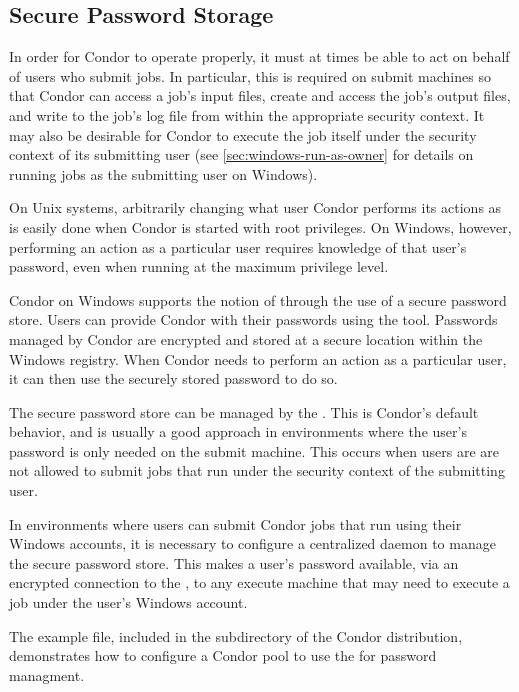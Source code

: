 \subsection{\label{sec:windows-sps}Secure Password Storage}

In order for Condor to operate properly, it must at times be able to
act on behalf of users who submit jobs.  In particular, this is
required on submit machines so that Condor can access a job's input
files, create and access the job's output files, and write to the
job's log file from within the appropriate security context.  It may
also be desirable for Condor to execute the job itself under the
security context of its submitting user (see
\ref{sec:windows-run-as-owner} for details on running jobs as the
submitting user on Windows).

On Unix systems, arbitrarily changing what user Condor performs its
actions as is easily done when Condor is started with root privileges.
On Windows, however, performing an action as a particular user
requires knowledge of that user's password, even when running at the
maximum privilege level.

Condor on Windows supports the notion of 
through the use of a secure password store.  Users can provide Condor
with their passwords using the  tool.  Passwords
managed by Condor are encrypted and stored at a secure location within the
Windows registry.  When Condor needs to perform an action as a
particular user, it can then use the securely stored password to do
so.

The secure password store can be managed by the .  This
is Condor's default behavior, and is usually a good approach in
environments where the user's password is only needed on the
submit machine.
This occurs when users are are not allowed to
submit jobs that run under the security context of the submitting
user.

In environments where users can submit Condor jobs that run using
their Windows accounts, it is necessary to configure a centralized
 daemon to manage the secure password store.  This makes a
user's password available, via an encrypted connection to the
, to any execute machine that may need to execute a job
under the user's Windows account.

The  example file, included in the
 subdirectory of the Condor distribution, demonstrates how
to configure a Condor pool to use the  for password
managment.

